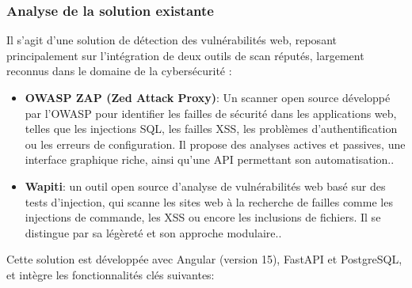     \subsubsection{Analyse de la solution existante}  
        Il s’agit d’une solution de détection des vulnérabilités web, reposant principalement sur l’intégration de deux outils de scan réputés, largement reconnus dans le domaine de la cybersécurité :
        \begin{itemize}[label=$-$]
            \item  \textbf{OWASP ZAP (Zed Attack Proxy)}: Un scanner open source développé par l’OWASP pour identifier les failles de sécurité dans les applications web, telles que les injections SQL, les failles XSS, les problèmes d’authentification ou les erreurs de configuration. Il propose des analyses actives et passives, une interface graphique riche, ainsi qu’une API permettant son automatisation.\cite{zap}.
            \item \textbf{Wapiti}: un outil open source d’analyse de vulnérabilités web basé sur des tests d’injection, qui scanne les sites web à la recherche de failles comme les injections de commande, les XSS ou encore les inclusions de fichiers. Il se distingue par sa légèreté et son approche modulaire.\cite{wapiti}.  
        \end{itemize}
         Cette solution est développée avec Angular (version 15), FastAPI et PostgreSQL, et intègre les fonctionnalités clés suivantes:
